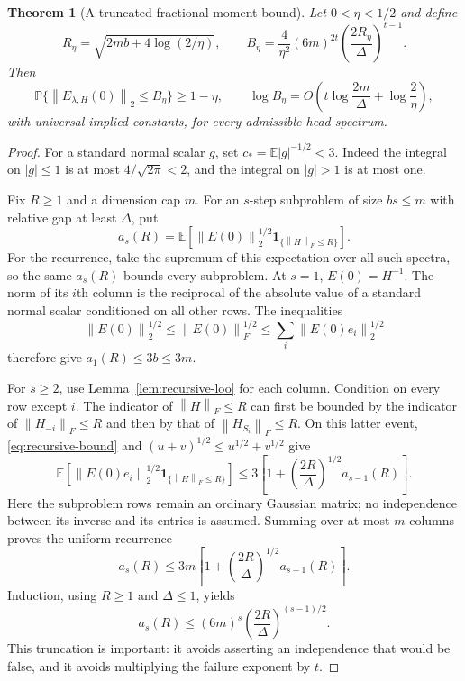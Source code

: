 \documentclass[11pt]{article}
\newtheorem{theorem}{Theorem}[section]
\theoremstyle{definition}
\newcommand{\Prob}{\mathbb P}
\newcommand{\E}{\mathbb E}
\newcommand{\norm}[1]{\left\lVert #1\right\rVert}
\begin{document}
\begin{theorem}[A truncated fractional-moment bound]
\label{thm:fractional-point}
Let $0<\eta<1/2$ and define
\begin{equation}
 R_\eta=\sqrt{2mb+4\log(2/\eta)},\qquad
 B_\eta=\frac4{\eta^2}(6m)^{2t}
                  \left(\frac{2R_\eta}{\Delta}\right)^{t-1}.
 \label{eq:fractional-B}
\end{equation}
Then
\begin{equation}
 \Prob\{\norm{E_{\lambda,H}(0)}_2\leq B_\eta\}\geq1-\eta,
 \qquad
 \log B_\eta=O\!\left(t\log\frac{2m}{\Delta}
                             +\log\frac2\eta\right),
 \label{eq:fractional-point}
\end{equation}
with universal implied constants, for every admissible head spectrum.
\end{theorem}
\begin{proof}
For a standard normal scalar $g$, set $c_* =\E|g|^{-1/2}<3$.
Indeed the integral on $|g|\leq1$ is at most $4/\sqrt{2\pi}<2$,
and the integral on $|g|>1$ is at most one.

Fix $R\geq1$ and a dimension cap $m$. For an $s$-step subproblem of size
$bs\leq m$ with relative gap at least $\Delta$, put
\[
 a_s(R)=\E\left[\norm{E(0)}_2^{1/2}
                     \mathbf1_{\{\norm{H}_F\leq R\}}\right].
\]
For the recurrence, take the supremum of this expectation over all such
spectra, so the same $a_s(R)$ bounds every subproblem. At $s=1$,
$E(0)=H^{-1}$. The norm of its $i$th column is the reciprocal of the
absolute value of a standard normal scalar conditioned on all other
rows. The inequalities
\[
 \norm{E(0)}_2^{1/2}\leq\norm{E(0)}_F^{1/2}
             \leq\sum_i\norm{E(0)e_i}_2^{1/2}
\]
therefore give $a_1(R)\leq3b\leq3m$.

For $s\geq2$, use Lemma~\ref{lem:recursive-loo} for each column. Condition
on every row except $i$. The indicator of $\norm{H}_F\leq R$ can first
be bounded by the indicator of $\norm{H_{-i}}_F\leq R$ and then by that
of $\norm{H_{S_i}}_F\leq R$. On this latter event,
\eqref{eq:recursive-bound} and $(u+v)^{1/2}\leq u^{1/2}+v^{1/2}$ give
\[
 \E\left[\norm{E(0)e_i}_2^{1/2}
          \mathbf1_{\{\norm{H}_F\leq R\}}\right]
 \leq3\left[1+\left(\frac{2R}{\Delta}\right)^{1/2}a_{s-1}(R)\right].
\]
Here the subproblem rows remain an ordinary Gaussian matrix; no
independence between its inverse and its entries is assumed. Summing over
at most $m$ columns proves the uniform recurrence
\[
 a_s(R)\leq3m\left[1+
                  \left(\frac{2R}{\Delta}\right)^{1/2}a_{s-1}(R)\right].
\]
Induction, using $R\geq1$ and $\Delta\leq1$, yields
\begin{equation}
 a_s(R)\leq(6m)^s
                    \left(\frac{2R}{\Delta}\right)^{(s-1)/2}.
 \label{eq:fractional-moment}
\end{equation}
This truncation is important: it avoids asserting an independence that
would be false, and it avoids multiplying the failure exponent by $t$.


\end{proof}
\end{document}
